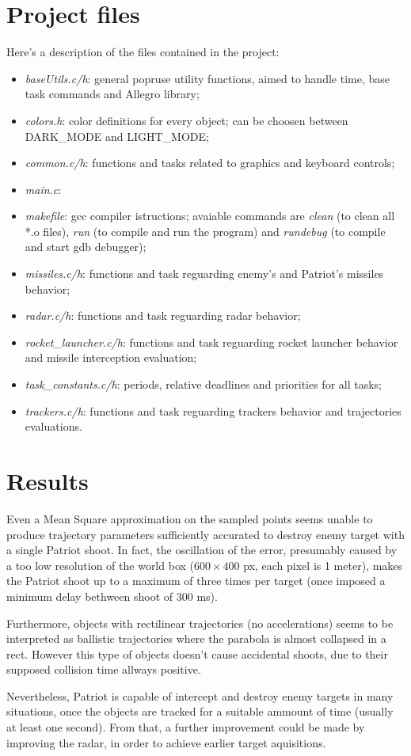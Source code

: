 \documentclass[notitlepage,a4paper,11pt]{article} %
\begin{document}
\section{Project files}

	Here's a description of the files contained in the project:
	\begin{itemize}
		\item \emph{baseUtils.c/h}: general popruse utility functions, aimed to handle time, base task commands and Allegro library;
		\item \emph{colors.h}: color definitions for every object; can be choosen between DARK\_MODE and LIGHT\_MODE;
		\item \emph{common.c/h}: functions and tasks related to graphics and keyboard controls;
		\item \emph{main.c}: 
		\item \emph{makefile}: gcc compiler istructions; avaiable commands are \emph{clean} (to clean all *.o files), \emph{run} (to compile and run the program) and \emph{rundebug} (to compile and start gdb debugger);
		\item \emph{missiles.c/h}: functions and task reguarding enemy's and Patriot's missiles behavior;
		\item \emph{radar.c/h}: functions and task reguarding radar behavior;
		\item \emph{rocket\_launcher.c/h}: functions and task reguarding rocket launcher behavior and missile interception evaluation;
		\item \emph{task\_constants.c/h}: periods, relative deadlines and priorities for all tasks;
		\item \emph{trackers.c/h}: functions and task reguarding trackers behavior and trajectories evaluations.
	\end{itemize}

\section{Results}

	Even a Mean Square approximation on the sampled points seems unable to produce trajectory parameters sufficiently accurated to destroy enemy target with a single Patriot shoot. In fact, the oscillation of the error, presumably caused by a too low resolution of the world box ($600\times400$ px, each pixel is 1 meter), makes the Patriot shoot up to a maximum of three times per target (once imposed a minimum delay bethween shoot of 300 ms).

	Furthermore, objects with rectilinear trajectories (no accelerations) seems to be interpreted as ballistic trajectories where the parabola is almost collapsed in a rect. However this type of objects doesn't cause accidental shoots, due to their supposed collision time allways positive.

	Nevertheless, Patriot is capable of intercept and destroy enemy targets in many situations, once the objects are tracked for a suitable ammount of time (usually at least one second). From that, a further improvement could be made by improving the radar, in order to achieve earlier target aquisitions.

\newpage
\hypersetup{linkcolor=black}
\listoffigures
\hypersetup{linkcolor=blue}
\end{document}
